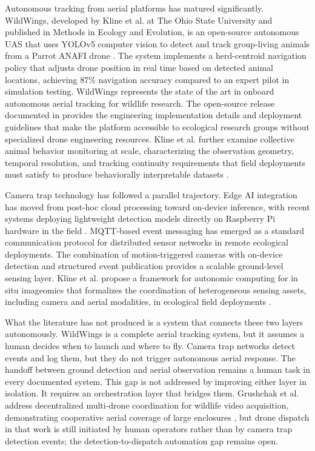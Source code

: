 Autonomous tracking from aerial platforms has matured significantly. WildWings, developed by Kline et al. at The Ohio State University and published in Methods in Ecology and Evolution, is an open-source autonomous UAS that uses YOLOv5 computer vision to detect and track group-living animals from a Parrot ANAFI drone \cite{kline2025wildwing}. The system implements a herd-centroid navigation policy that adjusts drone position in real time based on detected animal locations, achieving 87\% navigation accuracy compared to an expert pilot in simulation testing. WildWings represents the state of the art in onboard autonomous aerial tracking for wildlife research. The open-source release documented in \cite{kline2026wildwing} provides the engineering implementation details and deployment guidelines that make the platform accessible to ecological research groups without specialized drone engineering resources. Kline et al. further examine collective animal behavior monitoring at scale, characterizing the observation geometry, temporal resolution, and tracking continuity requirements that field deployments must satisfy to produce behaviorally interpretable datasets \cite{kline2025studying}.

Camera trap technology has followed a parallel trajectory. Edge AI integration has moved from post-hoc cloud processing toward on-device inference, with recent systems deploying lightweight detection models directly on Raspberry Pi hardware in the field \cite{velascomontero2024reliable,kelly2010determining}. MQTT-based event messaging has emerged as a standard communication protocol for distributed sensor networks in remote ecological deployments. The combination of motion-triggered cameras with on-device detection and structured event publication provides a scalable ground-level sensing layer. Kline et al. propose a framework for autonomic computing for in situ imageomics that formalizes the coordination of heterogeneous sensing assets, including camera and aerial modalities, in ecological field deployments \cite{kline2023framework}.

What the literature has not produced is a system that connects these two layers autonomously. WildWings is a complete aerial tracking system, but it assumes a human decides when to launch and where to fly. Camera trap networks detect events and log them, but they do not trigger autonomous aerial response. The handoff between ground detection and aerial observation remains a human task in every documented system. This gap is not addressed by improving either layer in isolation. It requires an orchestration layer that bridges them. Grushchak et al. address decentralized multi-drone coordination for wildlife video acquisition, demonstrating cooperative aerial coverage of large enclosures \cite{grushchak2024decentralized}, but drone dispatch in that work is still initiated by human operators rather than by camera trap detection events; the detection-to-dispatch automation gap remains open.

